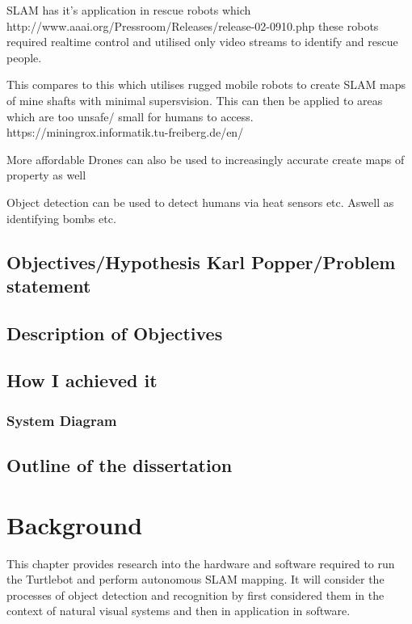 \documentclass{mproj}
\begin{document}
SLAM has it's application in rescue robots which
http://www.aaai.org/Pressroom/Releases/release-02-0910.php
these robots required realtime control and utilised only video streams to identify and rescue people.

This compares to this which utilises rugged mobile robots to create SLAM maps of mine shafts with minimal supersvision. This can then be applied to areas which are too unsafe/ small for humans to access.
https://miningrox.informatik.tu-freiberg.de/en/

More affordable Drones can also be used to increasingly accurate create maps of property as well

Object detection can be used to detect humans via heat sensors etc. Aswell as identifying bombs etc.



\section{Objectives/Hypothesis Karl Popper/Problem statement}

\section{Description of Objectives}

\section{How I achieved it} 

\subsection{System Diagram} 

\section{Outline of the dissertation} 




\chapter{Background}\label{survey}

This chapter provides research into the hardware and software required to run the Turtlebot and perform autonomous SLAM mapping.
It will consider the processes of object detection and recognition by first considered them in the context of natural visual systems and then in application in software.
\end{document}
